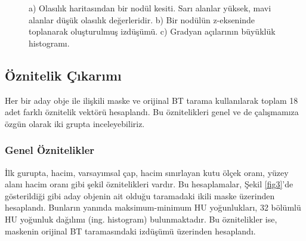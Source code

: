 \documentclass[conference]{IEEEtran}
\begin{document}
\begin{figure}[t]
\centering
{}
\caption{a) Olasılık haritasından bir nodül kesiti. Sarı alanlar yüksek, mavi alanlar düşük olasılık değerleridir. b) Bir nodülün z-ekseninde toplanarak oluşturulmuş izdüşümü. c) Gradyan açılarının büyüklük histogramı.}
\label{fig2}
\end{figure}

\subsection{Öznitelik Çıkarımı}\label{oznitelik}
Her bir aday obje ile ilişkili maske ve orijinal BT tarama kullanılarak toplam 18 adet farklı öznitelik vektörü hesaplandı. Bu öznitelikleri genel ve de çalışmamıza özgün olarak iki grupta inceleyebiliriz.

\subsubsection{Genel Öznitelikler}
İlk gurupta, hacim, varsayımsal çap, hacim sınırlayan kutu ölçek oranı, yüzey alanı hacim oranı gibi şekil öznitelikleri vardır. Bu hesaplamalar, Şekil \ref{fig3}'de gösterildiği gibi aday objenin ait olduğu taramadaki ikili maske üzerinden hesaplandı. Bunların yanında maksimum-minimum HU yoğunlukları, 32 bölümlü HU yoğunluk dağılımı (ing. histogram) bulunmaktadır. Bu öznitelikler ise, maskenin orijinal BT taramasındaki izdüşümü üzerinden hesaplandı.
\end{document}
